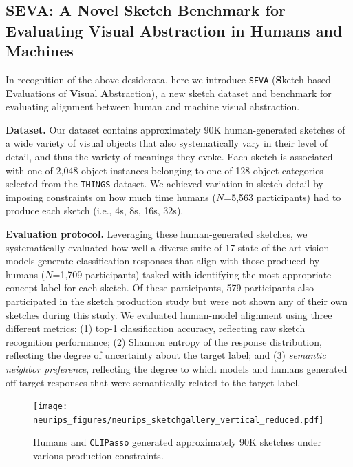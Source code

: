 \documentclass{article}
\begin{document}
\vspace{-1em}
\subsection{SEVA: A Novel Sketch Benchmark for Evaluating Visual Abstraction in Humans and Machines}
\vspace{-1em}
In recognition of the above desiderata, here we introduce \texttt{SEVA} (\textbf{S}ketch-based \textbf{E}valuations of \textbf{V}isual \textbf{A}bstraction), a new sketch dataset and benchmark for evaluating alignment between human and machine visual abstraction. 

\textbf{Dataset.} Our dataset contains approximately 90K human-generated sketches of a wide variety of visual objects that also systematically vary in their level of detail, and thus the variety of meanings they evoke. 
Each sketch is associated with one of 2,048 object instances belonging to one of 128 object categories selected from the \texttt{THINGS} dataset\cite{hebart2019things}. 
We achieved variation in sketch detail by imposing constraints on how much time humans ($N$=5,563 participants) had to produce each sketch (i.e., 4s, 8s, 16s, 32s). 

\textbf{Evaluation protocol.} Leveraging these human-generated sketches, we systematically evaluated how well a diverse suite of 17 state-of-the-art vision models generate classification responses that align with those produced by humans ($N$=1,709 participants) tasked with identifying the most appropriate concept label for each sketch. 
Of these participants, 579 participants also participated in the sketch production study but were not shown any of their own sketches during this study.
We evaluated human-model alignment using three different metrics: (1) top-1 classification accuracy, reflecting raw sketch recognition performance; (2) Shannon entropy of the response distribution, reflecting the degree of uncertainty about the target label; and (3) \textit{semantic neighbor preference}, reflecting the degree to which models and humans generated off-target responses that were semantically related to the target label. 

\begin{figure}[ht!]
    \centering
    \texttt{[image: neurips\_figures/neurips\_sketchgallery\_vertical\_reduced.pdf]}
    \caption{Humans and \texttt{CLIPasso} generated approximately 90K sketches under various production constraints.}
    \label{fig:examplegallery}
\end{figure}
\end{document}
